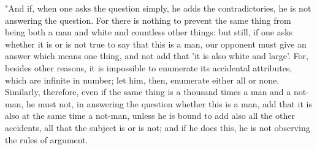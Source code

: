"And if, when one asks the question simply, he adds the contradictories,
he is not answering the question. For there is nothing to prevent
the same thing from being both a man and white and countless other
things: but still, if one asks whether it is or is not true to say
that this is a man, our opponent must give an answer which means one
thing, and not add that 'it is also white and large'. For, besides
other reasons, it is impossible to enumerate its accidental attributes,
which are infinite in number; let him, then, enumerate either all
or none. Similarly, therefore, even if the same thing is a thousand
times a man and a not-man, he must not, in answering the question
whether this is a man, add that it is also at the same time a not-man,
unless he is bound to add also all the other accidents, all that the
subject is or is not; and if he does this, he is not observing the
rules of argument. 

